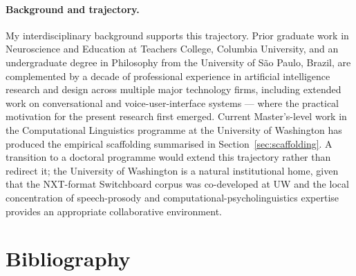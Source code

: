 \documentclass[11pt,letterpaper]{article}
\begin{document}
\paragraph{Background and trajectory.} My interdisciplinary background supports this trajectory. Prior graduate work in Neuroscience and Education at Teachers College, Columbia University, and an undergraduate degree in Philosophy from the University of S\~{a}o Paulo, Brazil, are complemented by a decade of professional experience in artificial intelligence research and design across multiple major technology firms, including extended work on conversational and voice-user-interface systems --- where the practical motivation for the present research first emerged. Current Master's-level work in the Computational Linguistics programme at the University of Washington has produced the empirical scaffolding summarised in Section~\ref{sec:scaffolding}. A transition to a doctoral programme would extend this trajectory rather than redirect it; the University of Washington is a natural institutional home, given that the NXT-format Switchboard corpus was co-developed at UW \citep{calhoun2010nxt} and the local concentration of speech-prosody and computational-psycholinguistics expertise provides an appropriate collaborative environment.

\section*{Bibliography}
\end{document}
